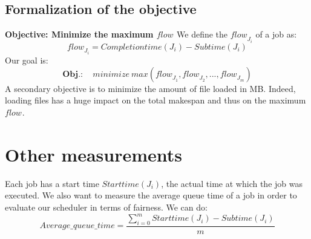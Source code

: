 \documentclass[a4paper]{article}
\newtheorem{definition}{Definition}
\newcommand{\Node}[1]{\ensuremath{\mathrm{Node}_{#1}}\xspace}
\newcommand{\flow}[1]{\ensuremath{\mathit{flow}_{#1}}\xspace}
\newcommand{\inputs}{\ensuremath{\mathcal{F}}\xspace}
\newcommand{\memory}{\ensuremath{\mathcal{M}}\xspace}
\newcommand{\submissiontime}{\mathit{Subtime}\xspace}
\newcommand{\completiontime}{\mathit{Completiontime}\xspace}
\newcommand{\start}{\mathit{Starttime}\xspace}
\newcommand{\evict}{\ensuremath{\mathcal{V}}\xspace}
\newcommand{\nbloads}{\ensuremath{\mathit{\mathit{Loads}}}\xspace}
\newcommand{\live}{\ensuremath{L}\xspace}
\begin{document}


\subsection{Formalization of the objective}
\textbf{Objective: Minimize the maximum \flow{}}
		We define the \flow{J_i} of a job as:
		$$
			\flow{J_i} = \completiontime(J_i) - \submissiontime(J_i)
		$$
		Our goal is:
		$$
			\textbf{Obj.}: \quad \mathit{minimize}~\mathit{max}(\flow{J_1}, \flow{J_2}, ..., \flow{J_m})
		$$
A secondary objective is to minimize the amount of file loaded in MB.
Indeed, loading files has a huge impact on the total makespan and thus on the maximum \flow{}.

\section{Other measurements}

Each job has a start time $\start(J_i)$, the actual time at which the job was executed.
We also want to measure the average queue time of a job in order
to evaluate our scheduler in terms of fairness. We can do:
$$
	Average\_queue\_time = \frac{\sum^{m}_{i = 0} \start(J_i) - \submissiontime(J_i)}{m}
$$
\end{document}
